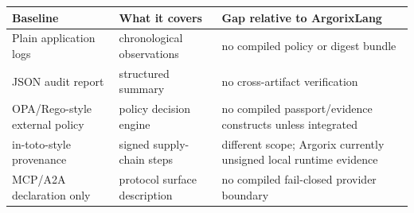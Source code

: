 \begin{tabularx}{\linewidth}{@{}XXX@{}}
\toprule
Baseline & What it covers & Gap relative to ArgorixLang \\
\midrule
Plain application logs & chronological observations & no compiled policy or digest bundle \\
JSON audit report & structured summary & no cross-artifact verification \\
OPA/Rego-style external policy & policy decision engine & no compiled passport/evidence constructs unless integrated \\
in-toto-style provenance & signed supply-chain steps & different scope; Argorix currently unsigned local runtime evidence \\
MCP/A2A declaration only & protocol surface description & no compiled fail-closed provider boundary \\
\bottomrule
\end{tabularx}

